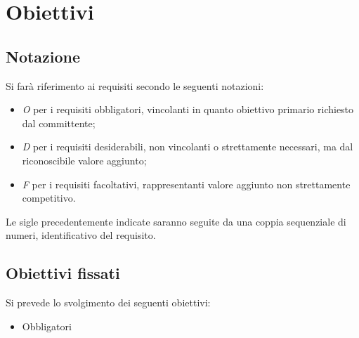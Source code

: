 \section*{Obiettivi}
\subsection*{Notazione}
Si farà riferimento ai requisiti secondo le seguenti notazioni:
\begin{itemize}
	\item \textit{O} per i requisiti obbligatori, vincolanti in quanto obiettivo primario richiesto dal committente;
	\item \textit{D} per i requisiti desiderabili, non vincolanti o strettamente necessari,
		  ma dal riconoscibile valore aggiunto;
	\item \textit{F} per i requisiti facoltativi, rappresentanti valore aggiunto non strettamente 
		  competitivo.
\end{itemize}

Le sigle precedentemente indicate saranno seguite da una coppia sequenziale di numeri, identificativo del requisito.

\subsection*{Obiettivi fissati}
Si prevede lo svolgimento dei seguenti obiettivi:
\begin{itemize}
	\item Obbligatori
	\begin{itemize}
		\obiettiviObbligatori
	\end{itemize}
	
	
\end{itemize}

\newpage